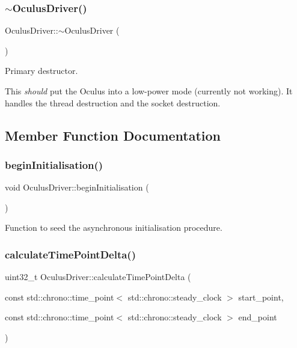 \subsubsection{\texorpdfstring{$\sim$\+Oculus\+Driver()}{~OculusDriver()}}
{\footnotesize\ttfamily Oculus\+Driver\+::$\sim$\+Oculus\+Driver (\begin{DoxyParamCaption}{ }\end{DoxyParamCaption})\hspace{0.3cm}{\ttfamily [virtual]}}

Primary destructor.

This {\itshape should} put the Oculus into a low-\/power mode (currently not working). It handles the thread destruction and the socket destruction. 

\subsection{Member Function Documentation}
\mbox{\label{classOculusDriver_ab55c1e754f2afae202fb518fb57beb91}} 
\subsubsection{\texorpdfstring{begin\+Initialisation()}{beginInitialisation()}}
{\footnotesize\ttfamily void Oculus\+Driver\+::begin\+Initialisation (\begin{DoxyParamCaption}{ }\end{DoxyParamCaption})}

Function to seed the asynchronous initialisation procedure. \mbox{\label{classOculusDriver_ade10c3b36326aaa76f572ebf08b3fcea}} 
\subsubsection{\texorpdfstring{calculate\+Time\+Point\+Delta()}{calculateTimePointDelta()}}
{\footnotesize\ttfamily uint32\+\_\+t Oculus\+Driver\+::calculate\+Time\+Point\+Delta (\begin{DoxyParamCaption}\item[{const std\+::chrono\+::time\+\_\+point$<$ std\+::chrono\+::steady\+\_\+clock $>$}]{start\+\_\+point,  }\item[{const std\+::chrono\+::time\+\_\+point$<$ std\+::chrono\+::steady\+\_\+clock $>$}]{end\+\_\+point }\end{DoxyParamCaption})}

